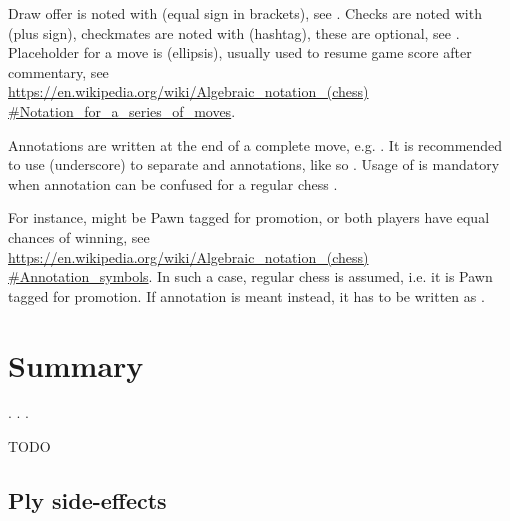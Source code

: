 Draw offer is noted with \alg{(=)} (equal sign in brackets), see .
Checks are noted with \alg{+} (plus sign), checkmates are noted with \alg{\#} (hashtag), these are optional, see .
Placeholder for a move is  (ellipsis), usually used to resume game score after commentary, see\\
\href{https://en.wikipedia.org/wiki/Algebraic\_notation\_(chess)\#Notation\_for\_a\_series\_of\_moves}{https://en.wikipedia.org/wiki/Algebraic\_notation\_(chess)\\
\#Notation\_for\_a\_series\_of\_moves}.

Annotations are written at the end of a complete move, e.g. . It is recommended to use \alg{\_} (underscore)
to separate  and annotations, like so . Usage of \alg{\_} is mandatory when annotation can be
confused for a regular chess .

For instance,  might be Pawn tagged for promotion, or both players have equal chances of winning, see\\
\href{https://en.wikipedia.org/wiki/Algebraic\_notation\_(chess)#Annotation\_symbols}{https://en.wikipedia.org/wiki/Algebraic\_notation\_(chess)\\
\#Annotation\_symbols}. In such a case, regular chess  is assumed, i.e. it is Pawn tagged for promotion.
If annotation is meant instead, it has to be written as .

\clearpage %

\section*{Summary}
\label{sec:Appendix/Summary}

. . .

\huge{TODO}
\normalsize{}

\clearpage %

\subsection*{Ply side-effects}
\label{sec:Appendix/Ply side-effects}

